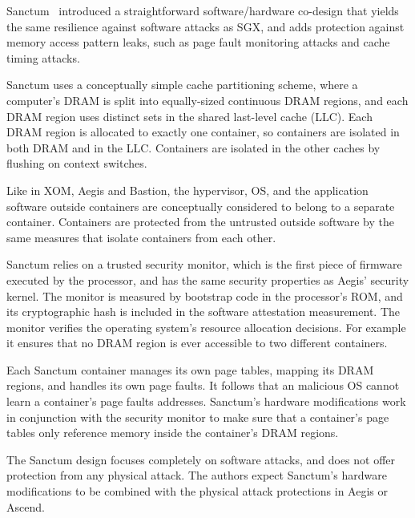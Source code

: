 \label{sec:related_sanctum}

Sanctum~\cite{costan2015sanctum} introduced a straightforward software/hardware
co-design that yields the same resilience against software attacks as SGX, and
adds protection against memory access pattern leaks, such as page fault
monitoring attacks and cache timing attacks.

Sanctum uses a conceptually simple cache partitioning scheme, where a
computer's DRAM is split into equally-sized continuous DRAM regions, and each
DRAM region uses distinct sets in the shared last-level cache (LLC). Each DRAM
region is allocated to exactly one container, so containers are isolated in
both DRAM and in the LLC. Containers are isolated in the other caches by
flushing on context switches.

Like in XOM, Aegis and Bastion, the hypervisor, OS, and the application
software outside containers are conceptually considered to belong to a separate
container. Containers are protected from the untrusted outside software by the
same measures that isolate containers from each other.

Sanctum relies on a trusted security monitor, which is the first piece of
firmware executed by the processor, and has the same security properties as
Aegis' security kernel. The monitor is measured by bootstrap code in the
processor's ROM, and its cryptographic hash is included in the software
attestation measurement. The monitor verifies the operating system's resource
allocation decisions. For example it ensures that no DRAM region is ever
accessible to two different containers.

Each Sanctum container manages its own page tables, mapping its DRAM regions,
and handles its own page faults. It follows that an malicious OS cannot learn
a container's page faults addresses. Sanctum's hardware modifications work in
conjunction with the security monitor to make sure that a container's page
tables only reference memory inside the container's DRAM regions.

The Sanctum design focuses completely on software attacks, and does not offer
protection from any physical attack. The authors expect Sanctum's hardware
modifications to be combined with the physical attack protections in Aegis or
Ascend.
